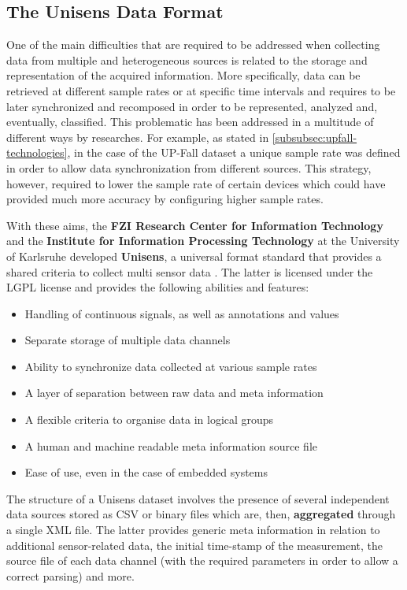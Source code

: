 \subsection{The Unisens Data Format}\label{subsec:unisens}

One of the main difficulties that are required to be addressed when collecting data from multiple and heterogeneous sources is related to the storage and representation of the acquired information. More specifically, data can be retrieved at different sample rates or at specific time intervals and requires to be later synchronized and recomposed in order to be represented, analyzed and, eventually, classified. This problematic has been addressed in a multitude of different ways by researches. For example, as stated in \ref{subsubsec:upfall-technologies}, in the case of the UP-Fall dataset a unique sample rate was defined in order to allow data synchronization from different sources. This strategy, however, required to lower the sample rate of certain devices which could have provided much more accuracy by configuring higher sample rates.

With these aims, the \textbf{FZI Research Center for Information Technology} and the \textbf{Institute for Information Processing Technology} at the University of Karlsruhe developed \textbf{Unisens}, a universal format standard that provides a shared criteria to collect multi sensor data \cite{unisens}. The latter is licensed under the LGPL license and provides the following abilities and features: 

\begin{itemize}
    \item Handling of continuous signals, as well as annotations and values
    \item Separate storage of multiple data channels
    \item Ability to synchronize data collected at various sample rates
    \item A layer of separation between raw data and meta information
    \item A flexible criteria to organise data in logical groups
    \item A human and machine readable meta information source file
    \item Ease of use, even in the case of embedded systems
\end{itemize}

The structure of a Unisens dataset involves the presence of several independent data sources stored as CSV or binary files which are, then, \textbf{aggregated} through a single XML file. The latter provides generic meta information in relation to additional sensor-related data, the initial time-stamp of the measurement, the source file of each data channel (with the required parameters in order to allow a correct parsing) and more.

